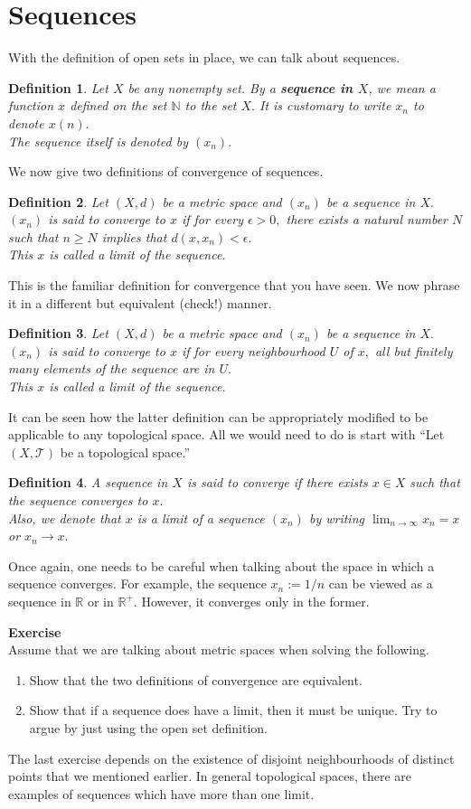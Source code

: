 \documentclass[12pt]{article}
\newtheorem{defn}{Definition}
\newcounter{exercise}
\newcommand{\exercise}{\refstepcounter{exercise}\par\medskip
   {\textbf{Exercise \theexercise }} \rmfamily}
\begin{document}
	\section{Sequences}
	With the definition of open sets in place, we can talk about sequences.
	\begin{defn}
		Let $X$ be any nonempty set. By a \textbf{sequence in $X$}, we mean a function $x$ defined on the set $\mathbb{N}$ to the set $X.$ It is customary to write $x_n$ to denote $x(n).$\\
		The sequence itself is denoted by $(x_n).$
	\end{defn}
	We now give two definitions of convergence of sequences.
	\begin{defn}
		Let $(X, d)$ be a metric space and $(x_n)$ be a sequence in $X.$\\
		$(x_n)$ is said to converge to $x$ if for every $\epsilon > 0,$ there exists a natural number $N$ such that $n \ge N$ implies that $d(x, x_n) < \epsilon.$\\
		This $x$ is called a limit of the sequence.
	\end{defn}
	This is the familiar definition for convergence that you have seen. We now phrase it in a different but equivalent (check!) manner.
	\begin{defn}
		Let $(X, d)$ be a metric space and $(x_n)$ be a sequence in $X.$\\
		$(x_n)$ is said to converge to $x$ if for every neighbourhood $U$ of $x,$ all but finitely many elements of the sequence are in $U.$\\
		This $x$ is called a limit of the sequence.
	\end{defn}
	It can be seen how the latter definition can be appropriately modified to be applicable to any topological space. All we would need to do is start with ``Let $(X, \mathcal{T})$ be a topological space.''
	\begin{defn}
		A sequence in $X$ is said to converge if there exists $x \in X$ such that the sequence converges to $x.$\\
		Also, we denote that $x$ is a limit of a sequence $(x_n)$ by writing $\displaystyle\lim_{n\to \infty}x_n = x$ or $x_n \to x.$
	\end{defn}
	Once again, one needs to be careful when talking about the space in which a sequence converges. For example, the sequence $x_n := 1/n$ can be viewed as a sequence in $\mathbb{R}$ or in $\mathbb{R}^+.$ However, it converges only in the former.\\
	\exercise\\
	Assume that we are talking about metric spaces when solving the following.
	\begin{enumerate}[nosep]
		\item Show that the two definitions of convergence are equivalent.
		\item Show that if a sequence does have a limit, then it must be unique. Try to argue by just using the open set definition.
	\end{enumerate}
	The last exercise depends on the existence of disjoint neighbourhoods of distinct points that we mentioned earlier. In general topological spaces, there are examples of sequences which have more than one limit.
\end{document}
